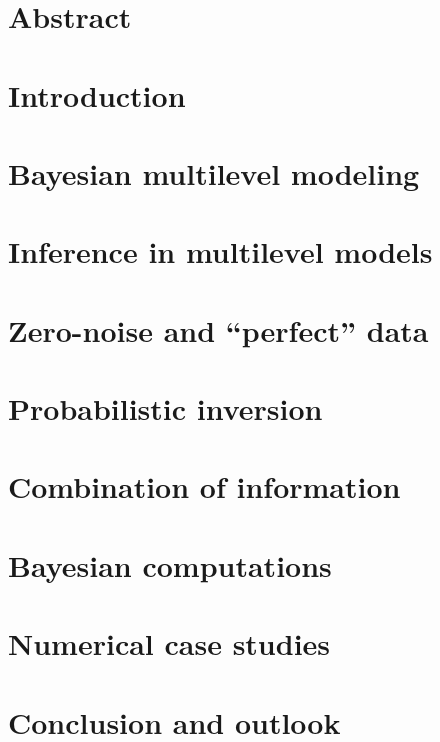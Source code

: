 \begin{refsection}

\section*{Abstract}


\section{Introduction}


\section{Bayesian multilevel modeling} \label{sec:PEM:Multilevel}


\section{Inference in multilevel models} \label{sec:PEM:Inference}


\section{Zero-noise and ``perfect'' data} \label{sec:PEM:PerfectData}


\section{Probabilistic inversion} \label{sec:PEM:ProbInv}


\section{Combination of information} \label{sec:PEM:CombInf}


\section{Bayesian computations} \label{sec:PEM:Computations}


\section{Numerical case studies} \label{sec:PEM:CaseStudies}


\section{Conclusion and outlook} \label{sec:PEM:Outlook}


\printbibliography[heading=subbibliography]
\end{refsection}